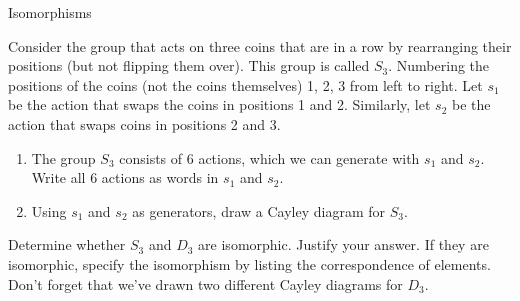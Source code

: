 \begin{section}{Isomorphisms}
\begin{exercise}\label{exer:S_3}
Consider the group that acts on three coins that are in a row by rearranging their positions (but not flipping them over).  This group is called $S_3$.  Numbering the positions of the coins (not the coins themselves) 1, 2, 3 from left to right.  Let $s_1$ be the action that swaps the coins in positions 1 and 2.  Similarly, let $s_2$ be the action that swaps coins in positions 2 and 3.
\begin{enumerate}[label=\rm{(\alph*)}]
\item The group $S_3$ consists of 6 actions, which we can generate with $s_1$ and $s_2$.  Write all 6 actions as words in $s_1$ and $s_2$.
\item Using $s_1$ and $s_2$ as generators, draw a Cayley diagram for $S_3$.
\end{enumerate}
\end{exercise}

\begin{problem}\label{prob:D3_iso_S3}
Determine whether $S_3$ and $D_3$ are isomorphic.  Justify your answer.  If they are isomorphic, specify the isomorphism by listing the correspondence of elements.  Don't forget that we've drawn two different Cayley diagrams for $D_3$.
\end{problem}

\end{section}